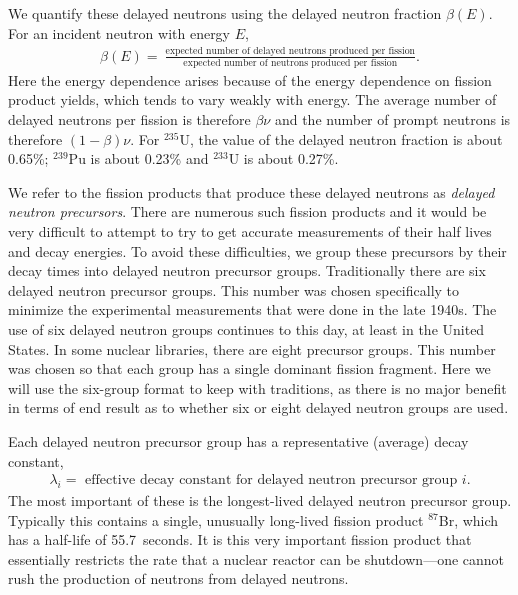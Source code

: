 We quantify these delayed neutrons using the delayed neutron fraction $\beta(E)$. For an incident neutron with energy $E$,
\begin{align}
  \beta(E) = \ \frac{\text{expected number of delayed neutrons produced per fission}}{\text{expected number of neutrons produced per fission}} . \nonumber
\end{align}
Here the energy dependence arises because of the energy dependence on fission product yields, which tends to vary weakly with energy. The average number of delayed neutrons per fission is therefore $\beta \nu$ and the number of prompt neutrons is therefore $(1 - \beta)\nu$. For $^{235}$U, the value of the delayed neutron fraction is about 0.65\%; $^{239}$Pu is about 0.23\% and $^{233}$U is about 0.27\%.

We refer to the fission products that produce these delayed neutrons as \emph{delayed neutron precursors}. There are numerous such fission products and it would be very difficult to attempt to try to get accurate measurements of their half lives and decay energies. To avoid these difficulties, we group these precursors by their decay times into delayed neutron precursor groups. Traditionally there are six delayed neutron precursor groups. This number was chosen specifically to minimize the experimental measurements that were done in the late 1940s. The use of six delayed neutron groups continues to this day, at least in the United States. In some nuclear libraries, there are eight precursor groups. This number was chosen so that each group has a single dominant fission fragment. Here we will use the six-group format to keep with traditions, as there is no major benefit in terms of end result as to whether six or eight delayed neutron groups are used.

Each delayed neutron precursor group has a representative (average) decay constant,
\begin{align}
  \lambda_i = \text{ effective decay constant for delayed neutron precursor group $i$.} \nonumber
\end{align}
The most important of these is the longest-lived delayed neutron precursor group. Typically this contains a single, unusually long-lived fission product $^{87}$Br, which has a half-life of 55.7~seconds. It is this very important fission product that essentially restricts the rate that a nuclear reactor can be shutdown---one cannot rush the production of neutrons from delayed neutrons.

